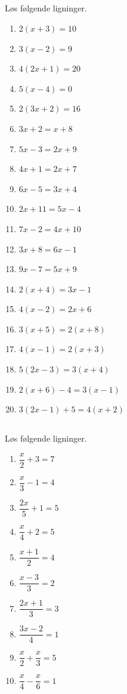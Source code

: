 \documentclass[10pt,a4paper,table]{article}
\begin{document}
\subsection{}
Løs følgende ligninger.
\begin{enumerate}[label=\arabic*)]
  \item $2(x + 3) = 10$
  \item $3(x - 2) = 9$
  \item $4(2x + 1) = 20$
  \item $5(x - 4) = 0$
  \item $2(3x + 2) = 16$
  \item $3x + 2 = x + 8$
  \item $5x - 3 = 2x + 9$
  \item $4x + 1 = 2x + 7$
  \item $6x - 5 = 3x + 4$
  \item $2x + 11 = 5x - 4$
  \item $7x - 2 = 4x + 10$
  \item $3x + 8 = 6x - 1$
  \item $9x - 7 = 5x + 9$
  \item $2(x + 4) = 3x - 1$
  \item $4(x - 2) = 2x + 6$
  \item $3(x + 5) = 2(x + 8)$
  \item $4(x - 1) = 2(x + 3)$
  \item $5(2x - 3) = 3(x + 4)$
  \item $2(x + 6) - 4 = 3(x - 1)$
  \item $3(2x - 1) + 5 = 4(x + 2)$
\end{enumerate}

\subsection{}
Løs følgende ligninger.
\begin{enumerate}[label=\arabic*)]
  \item $\dfrac{x}{2} + 3 = 7$
  \item $\dfrac{x}{3} - 1 = 4$
  \item $\dfrac{2x}{5} + 1 = 5$
  \item $\dfrac{x}{4} + 2 = 5$
  \item $\dfrac{x+1}{2} = 4$
  \item $\dfrac{x-3}{3} = 2$
  \item $\dfrac{2x+1}{3} = 3$
  \item $\dfrac{3x-2}{4} = 1$
  \item $\dfrac{x}{2} + \dfrac{x}{3} = 5$
  \item $\dfrac{x}{4} - \dfrac{x}{6} = 1$
\end{enumerate}
\end{document}
